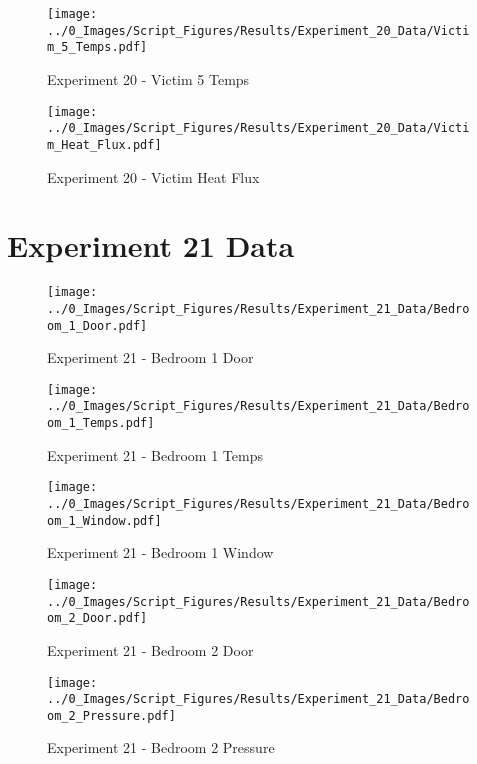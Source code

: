 	\begin{figure}[H]
		\centering
		\texttt{[image: ../0\_Images/Script\_Figures/Results/Experiment\_20\_Data/Victim\_5\_Temps.pdf]}
		\caption[]{Experiment 20 - Victim 5 Temps}
	\end{figure}
 
	\clearpage

	\begin{figure}[H]
		\centering
		\texttt{[image: ../0\_Images/Script\_Figures/Results/Experiment\_20\_Data/Victim\_Heat\_Flux.pdf]}
		\caption[]{Experiment 20 - Victim Heat Flux}
	\end{figure}
 

\clearpage		\large
\section{Experiment 21 Data} \label{App:Exp21Results} 

	\begin{figure}[H]
		\centering
		\texttt{[image: ../0\_Images/Script\_Figures/Results/Experiment\_21\_Data/Bedroom\_1\_Door.pdf]}
		\caption[]{Experiment 21 - Bedroom 1 Door}
	\end{figure}
 

	\begin{figure}[H]
		\centering
		\texttt{[image: ../0\_Images/Script\_Figures/Results/Experiment\_21\_Data/Bedroom\_1\_Temps.pdf]}
		\caption[]{Experiment 21 - Bedroom 1 Temps}
	\end{figure}
 
	\clearpage

	\begin{figure}[H]
		\centering
		\texttt{[image: ../0\_Images/Script\_Figures/Results/Experiment\_21\_Data/Bedroom\_1\_Window.pdf]}
		\caption[]{Experiment 21 - Bedroom 1 Window}
	\end{figure}
 

	\begin{figure}[H]
		\centering
		\texttt{[image: ../0\_Images/Script\_Figures/Results/Experiment\_21\_Data/Bedroom\_2\_Door.pdf]}
		\caption[]{Experiment 21 - Bedroom 2 Door}
	\end{figure}
 
	\clearpage

	\begin{figure}[H]
		\centering
		\texttt{[image: ../0\_Images/Script\_Figures/Results/Experiment\_21\_Data/Bedroom\_2\_Pressure.pdf]}
		\caption[]{Experiment 21 - Bedroom 2 Pressure}
	\end{figure}
 

